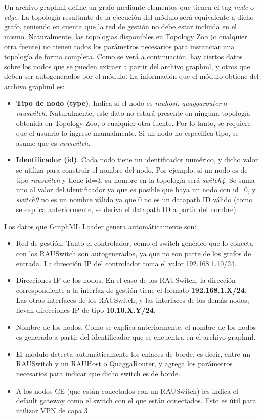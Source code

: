 Un archivo graphml define un grafo mediante elementos que tienen el tag \textit{node} o \textit{edge}. La topología resultante de la ejecución del módulo será equivalente a dicho grafo, teniendo en cuenta que la red de gestión no debe estar incluida en el mismo. Naturalmente, las topologias disponibles en Topology Zoo (o cualquier otra fuente) no tienen todos los parámetros necesarios para instanciar una topología de forma completa. Como se verá a continuación, hay ciertos datos sobre los nodos que se pueden extraer a partir del archivo graphml, y otros que deben ser autogenerados por el módulo. La información que el módulo obtiene del archivo graphml es:
\begin{itemize}
	\item \textbf{Tipo de nodo (type)}. Indica si el nodo es \textit{rauhost}, \textit{quaggarouter} o \textit{rauswitch}. Naturalmente, este dato no estará presente en ninguna topología obtenida en Topology Zoo, o cualquier otra fuente. Por lo tanto, se requiere que el usuario lo ingrese manualmente. Si un nodo no especifica tipo, se asume que es \textit{rauswitch}.
	\item \textbf{Identificador (id)}. Cada nodo tiene un identificador numérico, y dicho valor se utiliza para construir el nombre del nodo. Por ejemplo, si un nodo es de tipo \textit{rauswitch} y tiene id=3, su nombre en la topología será \textit{switch4}. Se suma uno al valor del identificador ya que es posible que haya un nodo con id=0, y \textit{switch0} no es un nombre válido ya que 0 no es un datapath ID válido (como se explica anteriormente, se deriva el datapath ID a partir del nombre).
\end{itemize}

Los datos que GraphML Loader genera automáticamente son:
\begin{itemize}
	\item Red de gestión. Tanto el controlador, como el switch genérico que lo conecta con los RAUSwitch son autogenerados, ya que no son parte de los grafos de entrada. La dirección IP del controlador toma el valor 192.168.1.10/24.
	\item Direcciones IP de los nodos. En el caso de los RAUSwitch, la dirección correspondiente a la interfaz de gestión tiene el formato \textbf{192.168.1.X/24}. Las otras interfaces de los RAUSwitch, y las interfaces de los demás nodos, llevan direcciones IP de tipo \textbf{10.10.X.Y/24}.
	\item Nombre de los nodos. Como se explica anteriormente, el nombre de los nodos es generado a partir del identificador que se encuentra en el archivo graphml.
	\item El módulo detecta automáticamente los enlaces de borde, es decir, entre un RAUSwitch y un RAUHost o QuaggaRouter, y agrega los parámetros necesarios para indicar que dicho switch es de borde.
	\item A los nodos CE (que están conectados con un RAUSwitch) les indica el default gateway como el switch con el que están conectados. Esto es útil para utilizar VPN de capa 3.
\end{itemize}

